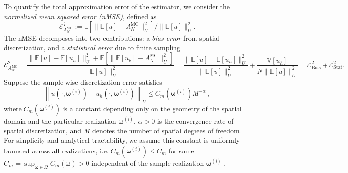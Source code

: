 To quantify the total approximation error of the estimator, we consider the  {\it normalized mean squared error (nMSE)}, defined as
%
 \[
\mathcal{E}_{A^{\text{MC}}_{N}}^2:= \mathbb E\left[ \big\| \mathbb{E}[u]-A^{\text{MC}}_{N}  \big\| _{U}^2\right] /  \big\| \mathbb{E}[u]  \big\| _{U}^2.
\] 
%
The nMSE decomposes into two contributions: a {\it bias error} from spatial discretization, and a {\it statistical error} due to finite sampling
%
\[
\mathcal{E}_{A^{\text{MC}}_{N}}^2 = \frac{ \big\| \mathbb{E}[u]-\mathbb{E}[u_{h}]  \big\| _{U}^2+\mathbb E\left[ \big\|  \mathbb{E}[u_{h}] -A^{\text{MC}}_{N}  \big\| _{U}^2\right]}{ \big\| \mathbb{E}[u]  \big\| _{U}^2} 
= \frac{ \big\| \mathbb{E}[u]-\mathbb{E}[u_{h}]  \big\| _{U}^2}{ \big\| \mathbb{E}[u]  \big\| _{U}^2}+\frac{\mathbb{V}\left[u_{h}\right]}{N \big\| \mathbb{E}[u]  \big\| _{U}^2}
=\mathcal{E}_{\text{Bias}}^2 + \mathcal{E}_{\text{Stat}}^2.
\]
%
Suppose the sample-wise discretization error satisfies
%
\begin{equation*} \label{eq:Assumption_uhA}
\left\|u\left(\cdot, \boldsymbol\omega^{(i)}\right)-u_h\left(\cdot,\boldsymbol\omega^{(i)}\right)\right\|_U\leq C_m\left(\boldsymbol\omega^{(i)}\right)M^{-\alpha}\,,
\end{equation*}
%
where $C_m(\boldsymbol\omega^{(i)})$ is a constant depending only on the geometry of the spatial domain and the particular realization $\boldsymbol\omega^{(i)}$, $\alpha>0$ is the convergence rate of spatial discretization, and $M$ denotes the number of spatial degrees of freedom. For simplicity and analytical tractability, we assume this constant is uniformly bounded across all realizations, i.e. $C_m(\boldsymbol\omega^{(i)})\le C_m$ for some $C_m=\sup_{\boldsymbol{\omega} \in \Omega} C_m(\boldsymbol{\omega})>0$ independent of the sample realization $\boldsymbol\omega^{(i)}$ \cite{BaNoTe:2007,BaScZo:2011}.


